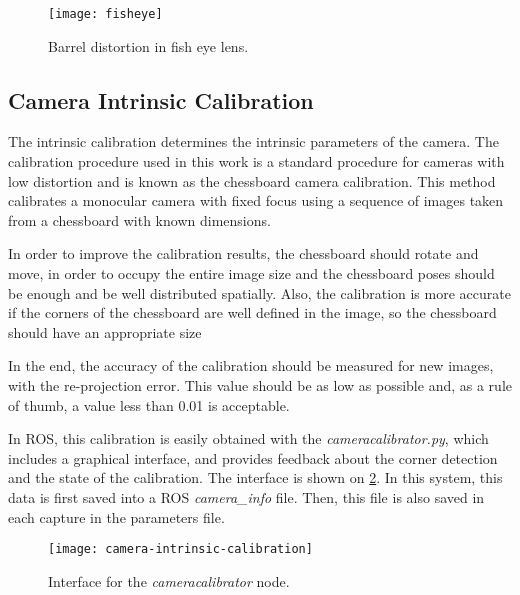 \begin{figure}[h]
    
    \centering
    \texttt{[image: fisheye]}

    \caption{Barrel distortion in fish eye lens.}
    \label{fig:fisheye}

\end{figure}

\subsection{Camera Intrinsic Calibration}
\label{section:camera-intrinsic-calibration}

The intrinsic calibration determines the intrinsic parameters of the camera. The calibration procedure used in this work is a standard procedure for cameras with low distortion and is known as the chessboard camera calibration. This method calibrates a monocular camera with fixed focus using a sequence of images taken from a chessboard with known dimensions.

In order to improve the calibration results, the chessboard should rotate and move, in order to occupy the entire image size and the chessboard poses should be enough and be well distributed spatially. Also, the calibration is more accurate if the corners of the chessboard are well defined in the image, so the chessboard should have an appropriate size

In the end, the accuracy of the calibration should be measured for new images, with the re-projection error. This value should be as low as possible and, as a rule of thumb, a value less than \num{0.01} is acceptable.

In ROS, this calibration is easily obtained with the \emph{cameracalibrator.py}, which includes a graphical interface, and provides feedback about the corner detection and the state of the calibration. The interface is shown on \cref{figure:camera-calibrator}. In this system, this data is first saved into a ROS \emph{camera\_info} file. Then, this file is also saved in each capture in the parameters file.

\begin{figure}
    
    \centering
    \texttt{[image: camera-intrinsic-calibration]}

    \caption{Interface for the \emph{cameracalibrator} node.}
    \label{figure:camera-calibrator}

\end{figure}

